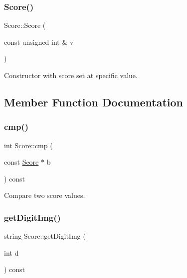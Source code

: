\subsubsection{\texorpdfstring{Score()}{Score()}\hspace{0.1cm}{\footnotesize\ttfamily [2/2]}}
{\footnotesize\ttfamily Score\+::\+Score (\begin{DoxyParamCaption}\item[{const unsigned int \&}]{v }\end{DoxyParamCaption})\hspace{0.3cm}{\ttfamily [inline]}}



Constructor with score set at specific value. 



\subsection{Member Function Documentation}
\mbox{\label{class_score_a9e284bd492bbc59091d671824b07de91}} 
\subsubsection{\texorpdfstring{cmp()}{cmp()}}
{\footnotesize\ttfamily int Score\+::cmp (\begin{DoxyParamCaption}\item[{const \mbox{\hyperlink{class_score}{Score}} $\ast$}]{b }\end{DoxyParamCaption}) const\hspace{0.3cm}{\ttfamily [inline]}}



Compare two score values. 

\mbox{\label{class_score_ac707716778b5df8de509549441fe9eeb}} 
\subsubsection{\texorpdfstring{get\+Digit\+Img()}{getDigitImg()}}
{\footnotesize\ttfamily string Score\+::get\+Digit\+Img (\begin{DoxyParamCaption}\item[{int}]{d }\end{DoxyParamCaption}) const\hspace{0.3cm}{\ttfamily [inline]}}



